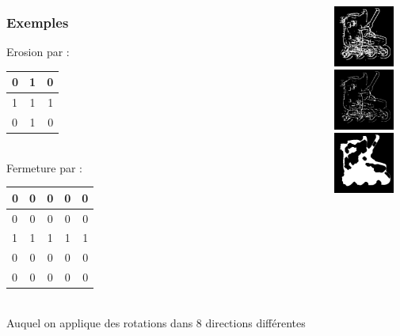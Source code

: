 \documentclass[french]{beamer}
\begin{document}
\begin{frame}
	\begin{columns}
		\begin{column}{5cm}
			\frametitle{Exemples}
			Erosion par : \\
			\medskip
			\begin{tabular}{|l|c|r|}
				\hline
				0 & 1 & 0 \\ \hline
				1 & 1 & 1 \\ \hline
				0 & 1 & 0 \\
				\hline
			\end{tabular} \\
			\medskip
			Fermeture par : \\
			\medskip
			\begin{tabular}{|l|c|c|c|r|}
				\hline
				0 & 0 & 0 & 0 & 0 \\ \hline
				0 & 0 & 0 & 0 & 0 \\ \hline
				1 & 1 & 1 & 1 & 1 \\ \hline
				0 & 0 & 0 & 0 & 0 \\ \hline
				0 & 0 & 0 & 0 & 0 \\
				\hline
			\end{tabular} \\
			\medskip
			Auquel on applique des rotations dans 8 directions différentes
		\end{column}
		\begin{column}{5cm}
			\includegraphics[width=2cm]{images/roller_bin.jpg}\\
			\includegraphics[width=2cm]{images/roller_bin-.jpg}\\
			\includegraphics[width=2cm]{images/roller_closedbin.jpg}
		\end{column}
	\end{columns}
\end{frame}
\end{document}
